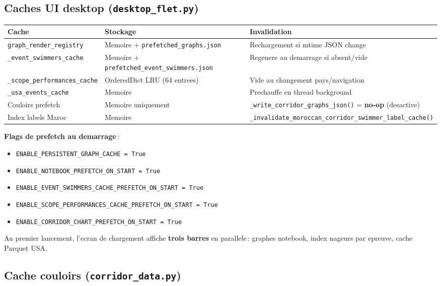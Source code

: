\documentclass[11pt,a4paper]{article}
\begin{document}
\subsection{Caches UI desktop (\texttt{desktop\_flet.py})}

\begin{longtable}{@{}p{}p{}p{}@{}}
\toprule
\textbf{Cache} & \textbf{Stockage} & \textbf{Invalidation} \\
\midrule
\endhead
\texttt{graph\_render\_registry} & Memoire + \texttt{prefetched\_graphs.json} & Rechargement si mtime JSON change \\
\texttt{\_event\_swimmers\_cache} & Memoire + \texttt{prefetched\_event\_swimmers.json} & Regenere au demarrage si absent/vide \\
\texttt{\_scope\_performances\_cache} & OrderedDict LRU (64 entrees) & Vide au changement pays/navigation \\
\texttt{\_usa\_events\_cache} & Memoire & Prechauffe en thread background \\
Couloirs prefetch & Memoire uniquement & \texttt{\_write\_corridor\_graphs\_json()} = \textbf{no-op} (desactive) \\
Index labels Maroc & Memoire & \texttt{\_invalidate\_moroccan\_corridor\_swimmer\_label\_cache()} \\
\bottomrule
\end{longtable}

\textbf{Flags de prefetch au demarrage}\,:
\begin{itemize}
  \item \texttt{ENABLE\_PERSISTENT\_GRAPH\_CACHE = True}
  \item \texttt{ENABLE\_NOTEBOOK\_PREFETCH\_ON\_START = True}
  \item \texttt{ENABLE\_EVENT\_SWIMMERS\_CACHE\_PREFETCH\_ON\_START = True}
  \item \texttt{ENABLE\_SCOPE\_PERFORMANCES\_CACHE\_PREFETCH\_ON\_START = True}
  \item \texttt{ENABLE\_CORRIDOR\_CHART\_PREFETCH\_ON\_START = True}
\end{itemize}

Au premier lancement, l'ecran de chargement affiche \textbf{trois barres} en parallele\,: graphes notebook, index nageurs par epreuve, cache Parquet USA.

\subsection{Cache couloirs (\texttt{corridor\_data.py})}
\end{document}
